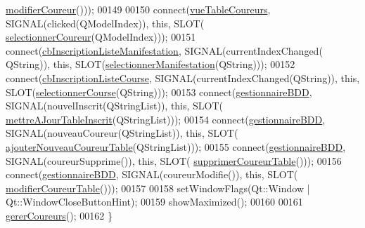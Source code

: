 \begin{DoxyCode}
      \hyperlink{class_i_h_m_gestion_cross_a1f41cea488ab477505f9d1792c4c2f36}{modifierCoureur}()));
00149 
00150     connect(\hyperlink{class_i_h_m_gestion_cross_a4a0ba98c5b671a38d67942254d2329db}{vueTableCoureurs}, SIGNAL(clicked(QModelIndex)), \textcolor{keyword}{this}, SLOT(
      \hyperlink{class_i_h_m_gestion_cross_ad71963d500fd61995fdae94e833db163}{selectionnerCoureur}(QModelIndex)));
00151     connect(\hyperlink{class_i_h_m_gestion_cross_a317ffd7cc1c9aa5d6e55c53568e44f98}{cbInscriptionListeManifestation}, SIGNAL(currentIndexChanged(
      QString)), \textcolor{keyword}{this}, SLOT(\hyperlink{class_i_h_m_gestion_cross_a60fc58610d01534b3df66ac7dd76b4dc}{selectionnerManifestation}(QString)));
00152     connect(\hyperlink{class_i_h_m_gestion_cross_aff44e6f1a225ee5b55783afe72049f83}{cbInscriptionListeCourse}, SIGNAL(currentIndexChanged(QString)), \textcolor{keyword}{this}, 
      SLOT(\hyperlink{class_i_h_m_gestion_cross_ae555b32462455a2cdaf0f8dc2e016d14}{selectionnerCourse}(QString)));
00153     connect(\hyperlink{class_i_h_m_gestion_cross_a440bac63a3e51db3e2c08e883f8cafc9}{gestionnaireBDD}, SIGNAL(nouvelInscrit(QStringList)), \textcolor{keyword}{this}, SLOT(
      \hyperlink{class_i_h_m_gestion_cross_a3c96fb9d92e9392ea83b380c3648bf55}{mettreAJourTableInscrit}(QStringList)));
00154     connect(\hyperlink{class_i_h_m_gestion_cross_a440bac63a3e51db3e2c08e883f8cafc9}{gestionnaireBDD}, SIGNAL(nouveauCoureur(QStringList)), \textcolor{keyword}{this}, SLOT(
      \hyperlink{class_i_h_m_gestion_cross_aa3e6f06ff2f4e724e2f0688528bcf386}{ajouterNouveauCoureurTable}(QStringList)));
00155     connect(\hyperlink{class_i_h_m_gestion_cross_a440bac63a3e51db3e2c08e883f8cafc9}{gestionnaireBDD}, SIGNAL(coureurSupprime()), \textcolor{keyword}{this}, SLOT(
      \hyperlink{class_i_h_m_gestion_cross_af13fabb9831fcd237c9c1e7ee75c47b8}{supprimerCoureurTable}()));
00156     connect(\hyperlink{class_i_h_m_gestion_cross_a440bac63a3e51db3e2c08e883f8cafc9}{gestionnaireBDD}, SIGNAL(coureurModifie()), \textcolor{keyword}{this}, SLOT(
      \hyperlink{class_i_h_m_gestion_cross_a3a969f85f31f25ed6df6a75a1cee2de1}{modifierCoureurTable}()));
00157 
00158     setWindowFlags(Qt::Window | Qt::WindowCloseButtonHint);
00159     showMaximized();
00160 
00161     \hyperlink{class_i_h_m_gestion_cross_ad46a2295500cf98dbc18f862f6020103}{gererCoureurs}();
00162 \}
\end{DoxyCode}
\mbox{\label{class_i_h_m_gestion_cross_a47cc1d5e80bea3d5e3396a8c16158c45}} 
